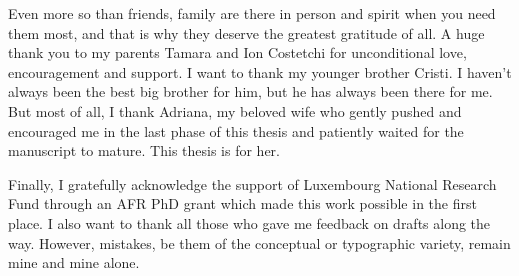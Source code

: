 \begin{acknowledgements}
Even more so than friends, family are there in person and spirit when you need them
most, and that is why they deserve the greatest gratitude of all. A huge thank you to my parents Tamara and Ion Costetchi for unconditional love, encouragement and support. I want to thank my younger brother Cristi. I haven't always been the best big brother
for him, but he has always been there for me. But most of all, I thank Adriana, my beloved wife who gently pushed and encouraged me in the last phase of this thesis and patiently waited for the manuscript to mature. This thesis is for her.  

Finally, I gratefully acknowledge the support of Luxembourg National Research Fund through an AFR PhD grant which made this work possible in the first place. I also want to thank all those who gave me feedback on drafts along the way. However, mistakes, be them of the conceptual or typographic variety, remain mine and mine alone. 

\end{acknowledgements}
